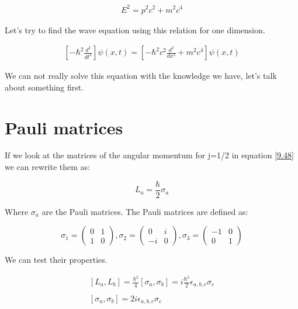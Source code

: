 \begin{equation}
  \begin{array}{c}
    E^2 = p^2c^2 + m^2c^4
  \end{array}
\end{equation}

Let's try to find the wave equation using this relation for one dimension.

\begin{equation}
  \begin{array}{c}
   \left[-\hbar^2\frac{d^2}{dt^2}\right]\psi(x,t) = \left[- \hbar^2c^2\frac{d^2}{dx^2}+m^2c^4\right]\psi(x,t)
  \end{array}
\end{equation}

We can not really solve this equation with the knowledge we have, let's talk about something first.

\section{Pauli matrices}

If we look at the matrices of the angular momentum for j=1/2 in equation \ref{9.48} we can rewrite them as:

\begin{equation}
  L_a =\frac{\hbar}{2} \sigma_a
\end{equation}

Where $\sigma_a$ are the Pauli matrices. The Pauli matrices are defined as:

\begin{equation}
  \sigma_1 = \begin{pmatrix}
    0 & 1 \\
    1 & 0
  \end{pmatrix},
  \sigma_2 = \begin{pmatrix}
    0 & i \\
    -i & 0
  \end{pmatrix},
  \sigma_3 = \begin{pmatrix}
    -1 & 0 \\
    0 & 1
  \end{pmatrix}
\end{equation}

We can test their properties.

\begin{equation}
  \begin{array}{c}
    \left[L_a,L_b\right] = \frac{\hbar^2}{4} \left[\sigma_a,\sigma_b\right] = i\frac{\hbar^2}{2}\epsilon_{a,b,c}\sigma_c
    \\

    \\
    \left[\sigma_a,\sigma_b\right] = 2i \epsilon_{a,b,c}\sigma_c
  \end{array}
\end{equation}

